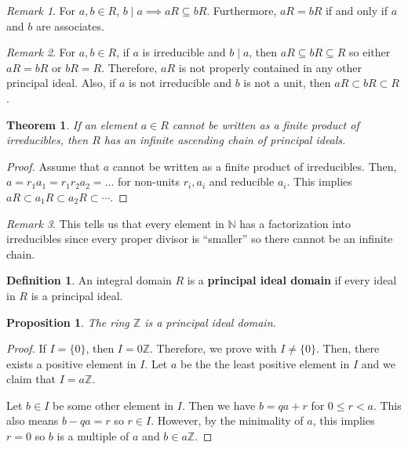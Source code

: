 \documentclass[
    parskip=half,
    toc=flat,
    toc=sectionentrydotfill,
]{scrartcl}  %
\theoremstyle{definition}
\newtheorem{definition}{Definition}[section]
\theoremstyle{plain}
\newtheorem{theorem}{Theorem}[definition]
\newtheorem{proposition}{Proposition}[definition]
\theoremstyle{remark}
\newtheorem{remark}{Remark}[definition]
\begin{document}
\begin{remark}
    For $a,b\in R$, $b\mid a\implies aR\subseteq bR$.
    Furthermore, $aR=bR$ if and only if $a$ and $b$ are associates.
\end{remark}

\begin{remark}
    For $a,b\in R$, if $a$ is irreducible and $b\mid a$, then
    $aR\subseteq bR\subseteq R$ so either $aR=bR$ or $bR=R$.
    Therefore, $aR$ is not properly contained in any other principal ideal.
    Also, if $a$ is not irreducible and $b$ is not a unit, then
    $aR\subset bR\subset R$.
\end{remark}

\begin{theorem}
    If an element $a\in R$ cannot be written as a finite product of
    irreducibles, then $R$ has an infinite ascending chain of principal ideals.
\end{theorem}

\begin{proof}
    Assume that $a$ cannot be written as a finite product of irreducibles.
    Then, $a=r_1a_1=r_1r_2a_2=\dots$ for non-units $r_i,a_i$ and reducible $a_i$.
    This implies $aR\subset a_1R\subset a_2R\subset\cdots$.
\end{proof}

\begin{remark}
    This tells us that every element in $\mathbb{N}$ has a factorization into
    irreducibles since every proper divisor is ``smaller'' so there cannot be
    an infinite chain.
\end{remark}

\begin{definition}
    An integral domain $R$ is a \textbf{principal ideal domain} if every ideal
    in $R$ is a principal ideal.
\end{definition}

\begin{proposition}
    \label{thm:integers is principal ideal domain}
    The ring $\mathbb{Z}$ is a principal ideal domain.
\end{proposition}

\begin{proof}
    If $I=\{0\}$, then $I=0\mathbb{Z}$.
    Therefore, we prove with $I\neq\{0\}$.
    Then, there exists a positive element in $I$.
    Let $a$ be the the least positive element in $I$ and we claim that
    $I=a\mathbb{Z}$.

    Let $b\in I$ be some other element in $I$.
    Then we have $b = qa + r$ for $0\leq r<a$.
    This also means $b-qa=r$ so $r\in I$.
    However, by the minimality of $a$, this implies $r=0$ so $b$ is a multiple
    of $a$ and $b\in a\mathbb{Z}$.
\end{proof}
\end{document}
